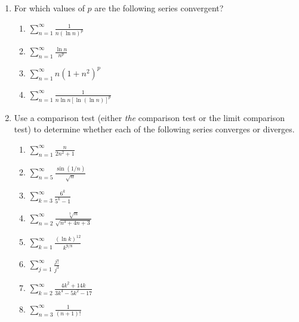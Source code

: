 \documentclass[12 pt]{article}
\newcommand{\infsum}[3]{\sum_{{#1}={#2}}^\infty {#3}}
\begin{document}
\begin{enumerate}[leftmargin=0in, rightmargin=-0.25in]
	\item For which values of $p$ are the following series convergent?
	\begin{multicols}{2}
		\begin{enumerate}
			\item $\sum_{n=1}^\infty\frac{1}{n(\ln{n})^p}$
			\item $\sum_{n=1}^\infty\frac{\ln{n}}{n^p}$
			\item $\sum_{n=1}^\infty n(1+n^2)^p$
			\item $\sum_{n=1}^\infty\frac{1}{n\ln{n}[\ln(\ln n)]^p}$
		\end{enumerate}
	\end{multicols}
	\newpage
	
	\item Use a comparison test (either \textit{the} comparison test or the limit comparison test) to determine whether each of the following series converges or diverges.
	\begin{multicols}{2}
		\begin{enumerate}[itemsep=0.45in]
			\item $\infsum{n}{1}{\frac{n}{2n^2+1}}$
			\item $\infsum{n}{5}{\frac{\sin(1/n)}{\sqrt{n}}}$
			\item $\infsum{k}{3}{\frac{6^k}{5^k-1}}$
			\item $\infsum{n}{2}{\frac{\sqrt[3]{n}}{\sqrt{n^3+4n+3}}}$
			\item $\infsum{k}{1}{\frac{(\ln{k})^{12}}{k^{9/8}}}$
			\item $\infsum{j}{1}{\frac{j!}{j^3}}$
			\item $\infsum{k}{2}{\frac{4k^2+14k}{3k^4-5k^2-17}}$
			\item $\infsum{n}{3}{\frac{1}{(n+1)!}}$
		\end{enumerate}
	\end{multicols}
	\vspace{0.125in}
	

\end{enumerate}
\end{document}
